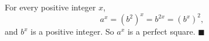For every positive integer $x$,
\[a^x=\left(b^2\right)^x=b^{2x}=\left(b^x\right)^2,\]
and $b^x$ is a positive integer. So $a^x$ is a perfect square. $\blacksquare$
